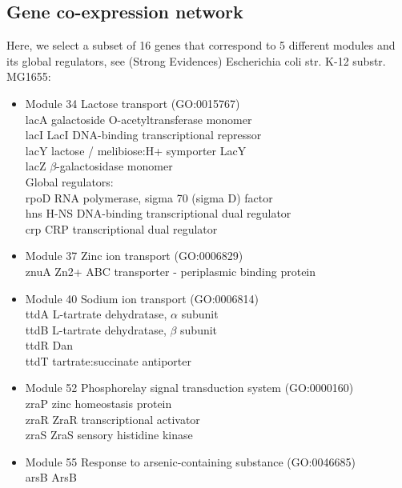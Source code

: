 \documentclass{bmcart}
\newcommand{\noun}[1]{\textsc{#1}}
\begin{document}
\subsection*{Gene\noun{ }co-expression\noun{ }network}
Here, we select a subset of 16 genes that correspond to 5 different modules and its global regulators, see (Strong Evidences) Escherichia coli str. K-12 substr. MG1655:
\begin{itemize}
\item Module 34 \textendash{} Lactose transport (GO:0015767)\\
 lacA \textendash{} galactoside O-acetyltransferase monomer\\
 lacI \textendash{} LacI DNA-binding transcriptional repressor\\
 lacY \textendash{} lactose / melibiose:H+ symporter LacY\\
 lacZ \textendash{} $\beta$-galactosidase monomer\\
 Global regulators:\\
 rpoD \textendash{} RNA polymerase, sigma 70 (sigma D) factor\\
 hns \textendash{} H-NS DNA-binding transcriptional dual regulator\\
 crp \textendash{} CRP transcriptional dual regulator
\item Module 37 \textendash{} Zinc ion transport (GO:0006829)\\
 znuA \textendash{} Zn2+ ABC transporter - periplasmic binding protein
\item Module 40 \textendash{} Sodium ion transport (GO:0006814)\\
 ttdA \textendash{} L-tartrate dehydratase, $\alpha$ subunit\\
 ttdB \textendash{} L-tartrate dehydratase, $\beta$ subunit\\
 ttdR \textendash{} Dan\\
 ttdT \textendash{} tartrate:succinate antiporter
\item Module 52 \textendash{} Phosphorelay signal transduction system (GO:0000160)\\
 zraP \textendash{} zinc homeostasis protein\\
 zraR \textendash{} ZraR transcriptional activator\\
 zraS \textendash{} ZraS sensory histidine kinase
\item Module 55 \textendash{} Response to arsenic-containing substance (GO:0046685)\\
 arsB \textendash{} ArsB 
\end{itemize}
\end{document}
